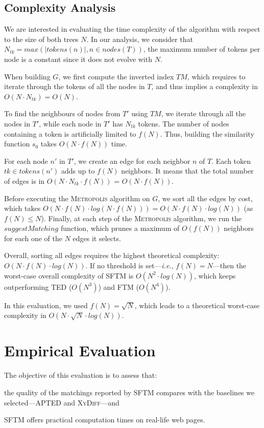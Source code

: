 \subsection{Complexity Analysis}\label{sec:complexity}
We are interested in evaluating the time complexity of the algorithm with respect to the size of both trees $N$.
In our analysis, we consider that $N_{tk}=max(|tokens(n)|, n \in nodes(T))$, the maximum number of tokens per node is a constant since it does not evolve with $N$.

When building $G$, we first compute the inverted index $TM$, which requires to iterate through the tokens of all the nodes in $T$, and thus implies a complexity in $O(N \cdot N_{tk}) = O(N)$.

To find the neighbours of nodes from $T'$ using $TM$, we iterate through all the nodes in $T'$, while each node in $T'$ has $N_{tk}$ tokens.
The number of nodes containing a token is artificially limited to $f(N)$.
Thus, building the similarity function $s_0$ takes $O(N \cdot f(N))$ time.

For each node $n'$ in $T'$, we create an edge for each neighbor $n$ of $T$.
Each token $tk \in tokens(n')$ adds up to $f(N)$ neighbors.
It means that the total number of edges is in $O(N \cdot N_{tk} \cdot f(N))$ = $O(N \cdot f(N))$.

Before executing the \textsc{Metropolis} algorithm on $G$, we sort all the edges by cost, which takes $O(N \cdot f(N) \cdot log(N \cdot f(N))) = O(N \cdot f(N) \cdot log(N))$ (as $f(N) \leq N$).
Finally, at each step of the \textsc{Metropolis} algorithm, we run the $suggestMatching$ function, which prunes a maximum of $O(f(N))$ neighbors for each one of the $N$ edges it selects.

Overall, sorting all edges requires the highest theoretical complexity: $O(N \cdot f(N) \cdot log(N))$.
If no threshold is set---\emph{i.e.}, $f(N) = N$---then the worst-case overall complexity of SFTM is $O(N^2 \cdot log(N))$, which keeps outperforming TED ($O(N^3)$) and FTM ($O(N^4)$).

In this evaluation, we used $f(N) = \sqrt{N}$, which leads to a theoretical worst-case complexity in $O(N \cdot \sqrt{N} \cdot log(N))$.

\section{Empirical Evaluation}\label{sec:evaluation}
The objective of this evaluation is to assess that:
\begin{compactenum}
	\item the quality of the matchings reported by SFTM compares with the baselines we selected---APTED and \textsc{XyDiff}---and
    \item SFTM offers practical computation times on real-life web pages.
\end{compactenum}

